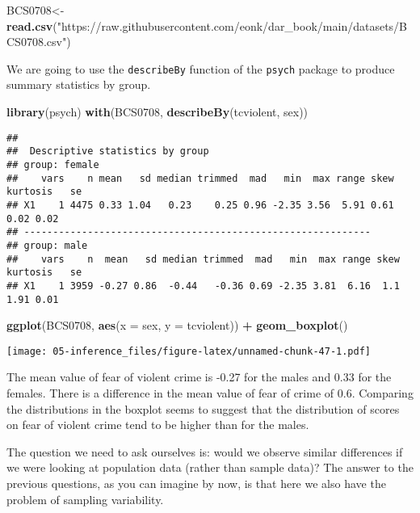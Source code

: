 \documentclass[
]{book}
\newenvironment{Shaded}{\begin{snugshade}}{\end{snugshade}}
\newcommand{\AttributeTok}[1]{\textcolor[rgb]{0.13,0.29,0.53}{#1}}
\newcommand{\FunctionTok}[1]{\textcolor[rgb]{0.13,0.29,0.53}{\textbf{#1}}}
\newcommand{\NormalTok}[1]{#1}
\newcommand{\OtherTok}[1]{\textcolor[rgb]{0.56,0.35,0.01}{#1}}
\newcommand{\SpecialCharTok}[1]{\textcolor[rgb]{0.81,0.36,0.00}{\textbf{#1}}}
\newcommand{\StringTok}[1]{\textcolor[rgb]{0.31,0.60,0.02}{#1}}
\begin{document}
\begin{Shaded}
\begin{Highlighting}[]
\NormalTok{BCS0708}\OtherTok{\textless{}{-}}\FunctionTok{read.csv}\NormalTok{(}\StringTok{"https://raw.githubusercontent.com/eonk/dar\_book/main/datasets/BCS0708.csv"}\NormalTok{)}
\end{Highlighting}
\end{Shaded}

We are going to use the \texttt{describeBy} function of the \texttt{psych} package to produce summary statistics by group.

\begin{Shaded}
\begin{Highlighting}[]
\FunctionTok{library}\NormalTok{(psych)}
\FunctionTok{with}\NormalTok{(BCS0708, }\FunctionTok{describeBy}\NormalTok{(tcviolent, sex))}
\end{Highlighting}
\end{Shaded}

\begin{verbatim}
## 
##  Descriptive statistics by group 
## group: female
##    vars    n mean   sd median trimmed  mad   min  max range skew kurtosis   se
## X1    1 4475 0.33 1.04   0.23    0.25 0.96 -2.35 3.56  5.91 0.61     0.02 0.02
## ------------------------------------------------------------ 
## group: male
##    vars    n  mean   sd median trimmed  mad   min  max range skew kurtosis   se
## X1    1 3959 -0.27 0.86  -0.44   -0.36 0.69 -2.35 3.81  6.16  1.1     1.91 0.01
\end{verbatim}

\begin{Shaded}
\begin{Highlighting}[]
\FunctionTok{ggplot}\NormalTok{(BCS0708, }\FunctionTok{aes}\NormalTok{(}\AttributeTok{x =}\NormalTok{ sex, }\AttributeTok{y =}\NormalTok{ tcviolent)) }\SpecialCharTok{+}
  \FunctionTok{geom\_boxplot}\NormalTok{()}
\end{Highlighting}
\end{Shaded}

\texttt{[image: 05-inference\_files/figure-latex/unnamed-chunk-47-1.pdf]}

The mean value of fear of violent crime is -0.27 for the males and 0.33 for the females. There is a difference in the mean value of fear of crime of 0.6. Comparing the distributions in the boxplot seems to suggest that the distribution of scores on fear of violent crime tend to be higher than for the males.

The question we need to ask ourselves is: would we observe similar differences if we were looking at population data (rather than sample data)? The answer to the previous questions, as you can imagine by now, is that here we also have the problem of sampling variability.
\end{document}
